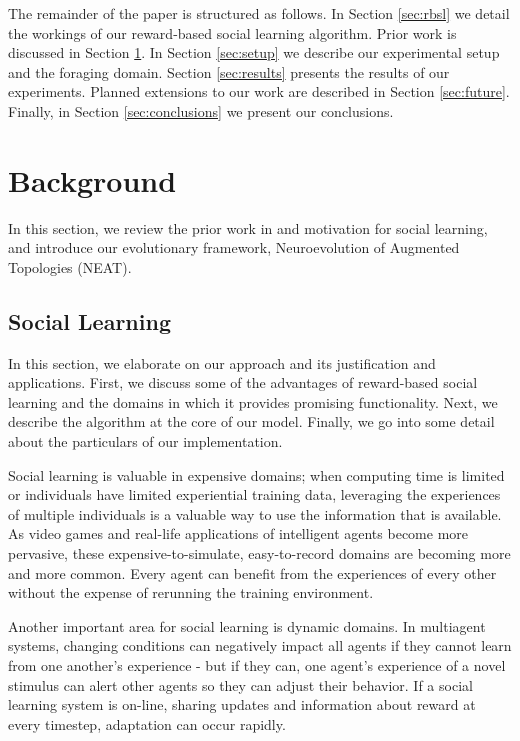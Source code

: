 \documentclass{acm_proc_article-sp}
\begin{document}
The remainder of the paper is structured as follows.
In Section \ref{sec:rbsl} we detail the workings of our reward-based social learning algorithm.
Prior work is discussed in Section \ref{sec:background}.
In Section \ref{sec:setup} we describe our experimental setup and the foraging domain.
Section \ref{sec:results} presents the results of our experiments.
Planned extensions to our work are described in Section \ref{sec:future}. Finally, in Section \ref{sec:conclusions} we present our conclusions.

\section{Background}
\label{sec:background}
In this section, we review the prior work in and motivation for social learning, and introduce our evolutionary framework, Neuroevolution of Augmented Topologies (NEAT).

\subsection*{Social Learning}

In this section, we elaborate on our approach and its justification and applications. First, we discuss some of the advantages of reward-based social learning and the domains in which it provides promising functionality. Next, we describe the algorithm at the core of our model. Finally, we go into some detail about the particulars of our implementation.

Social learning is valuable in expensive domains; when computing time is limited or individuals have limited experiential training data, leveraging the experiences of multiple individuals is a valuable way to use the information that is available. As video games and real-life applications of intelligent agents become more pervasive, these expensive-to-simulate, easy-to-record domains are becoming more and more common. Every agent can benefit from the experiences of every other without the expense of rerunning the training environment.

Another important area for social learning is dynamic domains. In multiagent systems, changing conditions can negatively impact all agents if they cannot learn from one another's experience - but if they can, one agent's experience of a novel stimulus can alert other agents so they can adjust their behavior. If a social learning system is on-line, sharing updates and information about reward at every timestep, adaptation can occur rapidly.
\end{document}
